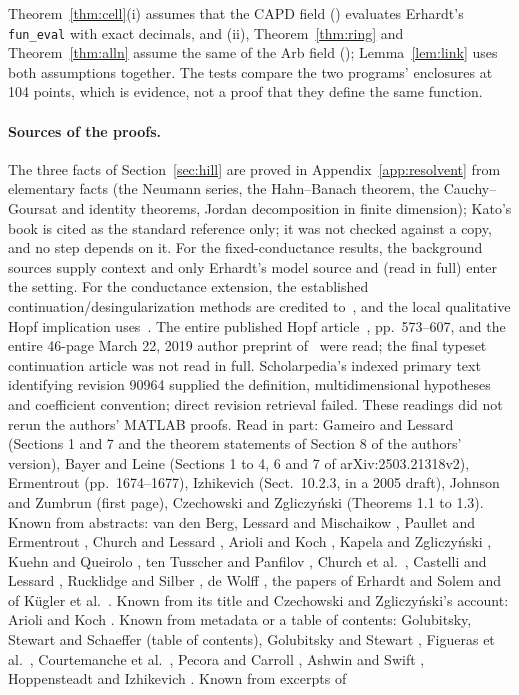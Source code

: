 \documentclass[11pt]{article}
\theoremstyle{definition}
\begin{document}
Theorem~\ref{thm:cell}(i) assumes that the CAPD field () evaluates Erhardt's \texttt{fun\_eval} with exact decimals, and (ii), Theorem~\ref{thm:ring} and Theorem~\ref{thm:alln} assume the same of the Arb field (); Lemma~\ref{lem:link} uses both assumptions together. The tests compare the two programs' enclosures at 104 points, which is evidence, not a proof that they define the same function.

\paragraph{Sources of the proofs.} The three facts of Section~\ref{sec:hill} are proved in Appendix~\ref{app:resolvent} from elementary facts (the Neumann series, the Hahn--Banach theorem, the Cauchy--Goursat and identity theorems, Jordan decomposition in finite dimension); Kato's book \cite{kato1976} is cited as the standard reference only; it was not checked against a copy, and no step depends on it. For the fixed-conductance results, the background sources supply context and only Erhardt's model source \cite{erhardtcode} and \cite{erhardt2025} (read in full) enter the setting. For the conductance extension, the established continuation/desingularization methods are credited to~\cite{vbq2021,vblq2021}, and the local qualitative Hopf implication uses~\cite{kuznetsov2006}. The entire published Hopf article~\cite{vblq2021}, pp.~573--607, and the entire 46-page March 22, 2019 author preprint of~\cite{vbq2021} were read; the final typeset continuation article was not read in full. Scholarpedia's indexed primary text identifying revision 90964 supplied the definition, multidimensional hypotheses and coefficient convention; direct revision retrieval failed. These readings did not rerun the authors' MATLAB proofs. Read in part: Gameiro and Lessard \cite{gl2017} (Sections 1 and 7 and the theorem statements of Section 8 of the authors' version), Bayer and Leine \cite{bl2026} (Sections 1 to 4, 6 and 7 of arXiv:2503.21318v2), Ermentrout \cite{ermentrout1992} (pp.~1674--1677), Izhikevich \cite{izh2007} (Sect.~10.2.3, in a 2005 draft), Johnson and Zumbrun \cite{jz2012} (first page), Czechowski and Zgliczy\'nski \cite{cz2016} (Theorems 1.1 to 1.3). Known from abstracts: van den Berg, Lessard and Mischaikow \cite{vblm2010}, Paullet and Ermentrout \cite{pe1994}, Church and Lessard \cite{cl2022}, Arioli and Koch \cite{ak2020}, Kapela and Zgliczy\'nski \cite{kz2003}, Kuehn and Queirolo \cite{kq2022}, ten Tusscher and Panfilov \cite{tp2006}, Church et al.\ \cite{cdhlv2026}, Castelli and Lessard \cite{cl2013}, Rucklidge and Silber \cite{rs1998}, de Wolff \cite{dewolff2023}, the papers of Erhardt and Solem \cite{es2021,es2022} and of K\"ugler et al.\ \cite{keb2017,keb2018}. Known from its title and Czechowski and Zgliczy\'nski's account: Arioli and Koch \cite{ak2015}. Known from metadata or a table of contents: Golubitsky, Stewart and Schaeffer \cite{gss1988} (table of contents), Golubitsky and Stewart \cite{gs1985}, Figueras et al.\ \cite{fgld2017}, Courtemanche et al.\ \cite{cgk1993}, Pecora and Carroll \cite{pc1998}, Ashwin and Swift \cite{as1992}, Hoppensteadt and Izhikevich \cite{hi1997}. Known from excerpts of 
\end{document}
